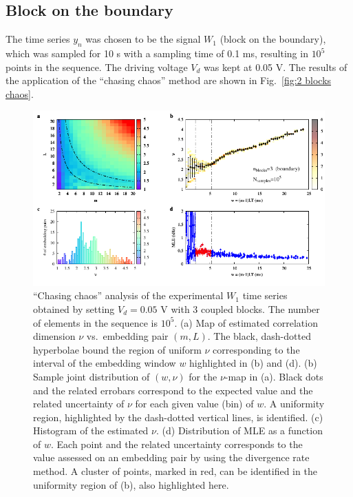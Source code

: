 \subsection{Block on the boundary}\label{subsec: 3 blocks chaos boundary}

The time series $y_n$ was chosen to be the signal $W_1$ (block on the boundary),
which was sampled for 10 s with a sampling time of 0.1 ms, resulting in $10^5$ points in the sequence.
The driving voltage $V_d$ was kept at 0.05 V. The results of the application of the
``chasing chaos'' method are shown in Fig.~\ref{fig:2 blocks chaos}.

\begin{figure}[!htbp]
    \centering
    \includegraphics[width=\linewidth]{../blocks/3_blocks/edge/1e5_points/plots/chaos_low.pdf}
    \caption{``Chasing chaos'' analysis of the experimental $W_1$ time series obtained by setting $V_d=0.05$ V with 3 coupled blocks.
    The number of elements in the sequence is $10^5$.
    (a) Map of estimated correlation dimension $\nu$ vs.\ embedding pair $(m, L)$.
    The black, dash-dotted hyperbolae bound the region of uniform $\nu$ corresponding to the interval of the
    embedding window $w$ highlighted in (b) and (d).
    (b) Sample joint distribution of $(w,\nu)$ for the $\nu$-map in (a).
    Black dots and the related errobars correspond to the expected value and the related uncertainty of $\nu$
    for each given value (bin) of $w$. A uniformity region, highlighted by the dash-dotted vertical lines,
    is identified. (c) Histogram of the estimated $\nu$. (d) Distribution of MLE as a function of $w$. Each point and the related
    uncertainty corresponds to the value assessed on an embedding pair by using the divergence rate method.
    A cluster of points, marked in red, can be identified in the uniformity region of (b), also highlighted here.
    }\label{fig:3 blocks chaos boundary 1e5}
\end{figure}

